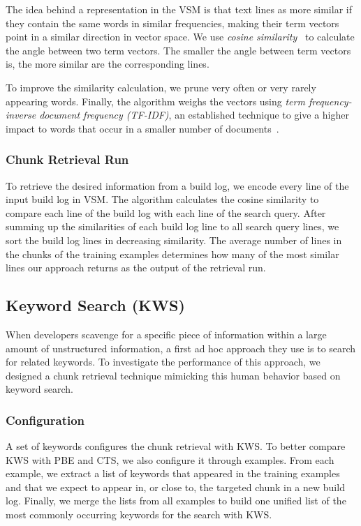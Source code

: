 The idea behind a representation in the VSM is that text lines as more
similar if they contain the same words in similar frequencies,
making their term vectors point in a similar direction in vector
space.
We use \emph{cosine similarity}~\citep{korenius2007principal}
to calculate the angle between two term vectors.
The smaller the
angle between term vectors is, the more similar are the corresponding
lines.

To improve the similarity calculation, we prune very often or
very rarely appearing words.
Finally, the
algorithm weighs the vectors using \emph{term frequency-inverse
document frequency (TF-IDF)}, an established technique to give a higher
impact to words that occur in a smaller number of
documents~\citep{lee1997document}.

\subsubsection{Chunk Retrieval Run}
To retrieve the desired information from a build log, we encode every
line of the input build log in VSM.
The algorithm calculates the cosine
similarity to compare each line of the
build log with each line of the search query.
After summing up the
similarities of each build log line to all search query lines, we sort
the build log lines in decreasing similarity.
The average number of
lines in the chunks of the training examples determines how many of
the most similar lines our approach returns as the output of the retrieval
run.

\subsection{Keyword Search (KWS)}
When developers scavenge for a specific piece of information within a
large amount of unstructured information, a first ad hoc approach they
use is to search for related keywords.
To investigate the performance of this approach, we designed a chunk
retrieval technique mimicking this human behavior based on keyword
search.

\subsubsection{Configuration}
A set of keywords configures the chunk retrieval with KWS\@.
To better
compare KWS with PBE and CTS, we also configure it through examples.
From each example, we extract a list of keywords that appeared in the
training examples and that we expect to appear
in, or close to, the targeted chunk in a new build log.
Finally, we merge the lists from all examples to build one unified
list of the most commonly occurring keywords for the search with KWS.

